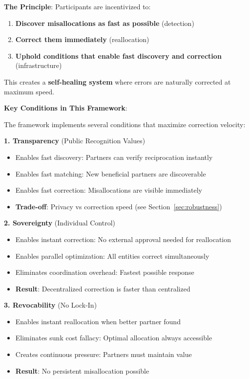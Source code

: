\documentclass[11pt,a4paper]{article}
\theoremstyle{definition}
\theoremstyle{remark}
\begin{document}
\textbf{The Principle}: Participants are incentivized to:
\begin{enumerate}
\item \textbf{Discover misallocations as fast as possible} (detection)
\item \textbf{Correct them immediately} (reallocation)
\item \textbf{Uphold conditions that enable fast discovery and correction} (infrastructure)
\end{enumerate}

This creates a \textbf{self-healing system} where errors are naturally corrected at maximum speed.

\textbf{Key Conditions in This Framework}:

The framework implements several conditions that maximize correction velocity:

\textbf{1. Transparency} (Public Recognition Values)
\begin{itemize}
\item Enables fast discovery: Partners can verify reciprocation instantly
\item Enables fast matching: New beneficial partners are discoverable
\item Enables fast correction: Misallocations are visible immediately
\item \textbf{Trade-off}: Privacy vs correction speed (see Section~\ref{sec:robustness})
\end{itemize}

\textbf{2. Sovereignty} (Individual Control)
\begin{itemize}
\item Enables instant correction: No external approval needed for reallocation
\item Enables parallel optimization: All entities correct simultaneously
\item Eliminates coordination overhead: Fastest possible response
\item \textbf{Result}: Decentralized correction is faster than centralized
\end{itemize}

\textbf{3. Revocability} (No Lock-In)
\begin{itemize}
\item Enables instant reallocation when better partner found
\item Eliminates sunk cost fallacy: Optimal allocation always accessible
\item Creates continuous pressure: Partners must maintain value
\item \textbf{Result}: No persistent misallocation possible
\end{itemize}
\end{document}
